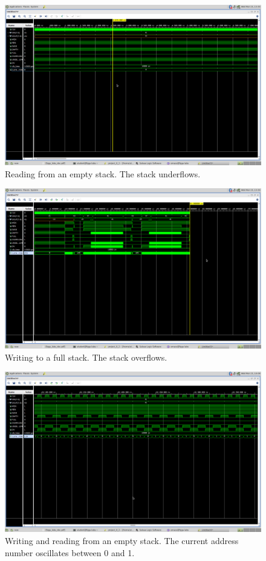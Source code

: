 \begin{figure}
    \includegraphics[width=.9\textwidth]{L8/E2/underflow.png}
    \caption{Reading from an empty stack. The stack underflows.}
    \label{pic: reading from an empty stack}
\end{figure}

\begin{figure}
    \includegraphics[width=.9\textwidth]{L8/E2/full.png}
    \caption{Writing to a full stack. The stack overflows.}
    \label{pic: writing to a full stack}
\end{figure}

\begin{figure}
    \includegraphics[width=.9\textwidth]{L8/E2/sim_read_write_underflow_empty.png}
    \caption{Writing and reading from an empty stack. The current address number oscillates between 0 and 1.}
    \label{pic: w and r from e stack}
\end{figure}

